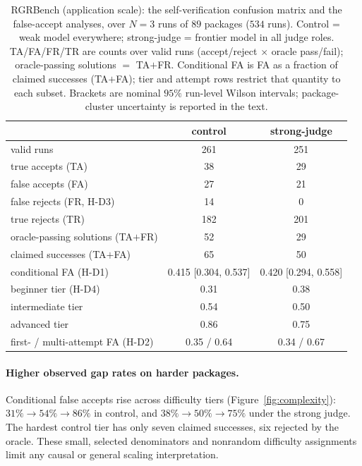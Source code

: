 \begin{table}[t]
\centering
\caption{RGRBench (application scale): the self-verification confusion matrix and the
false-accept analyses, over $N{=}3$ runs of $89$ packages ($534$ runs). Control = weak model
everywhere; strong-judge = frontier model in all judge roles. TA/FA/FR/TR are counts over
valid runs (accept/reject $\times$ oracle pass/fail); oracle-passing solutions $=$ TA${+}$FR.
Conditional FA is FA as a fraction of claimed successes (TA${+}$FA); tier and attempt rows
restrict that quantity to each subset. Brackets are nominal $95\%$ run-level Wilson
intervals; package-cluster uncertainty is reported in the text.}
\label{tab:scale}
\small
\begin{tabular}{lcc}
\toprule
 & control & strong-judge \\
\midrule
valid runs                           & 261 & 251 \\
true accepts (TA)                    & 38  & 29  \\
false accepts (FA)                   & 27  & 21  \\
false rejects (FR, H-D3)             & 14  & 0   \\
true rejects (TR)                    & 182 & 201 \\
oracle-passing solutions (TA${+}$FR) & 52  & 29  \\
\midrule
claimed successes (TA${+}$FA)        & 65 & 50 \\
conditional FA (H-D1) & 0.415 [0.304, 0.537] & 0.420 [0.294, 0.558] \\
\quad beginner tier (H-D4) & 0.31 & 0.38 \\
\quad intermediate tier & 0.54 & 0.50 \\
\quad advanced tier & 0.86 & 0.75 \\
first- / multi-attempt FA (H-D2) & 0.35 / 0.64 & 0.34 / 0.67 \\
\bottomrule
\end{tabular}
\end{table}

\paragraph{Higher observed gap rates on harder packages.} Conditional false accepts rise
across difficulty tiers (Figure~\ref{fig:complexity}): $31\% \to 54\% \to 86\%$ in control,
and $38\% \to 50\% \to 75\%$ under the strong judge. The hardest control tier has only seven
claimed successes, six rejected by the oracle. These small, selected denominators and
nonrandom difficulty assignments limit any causal or general scaling interpretation.

